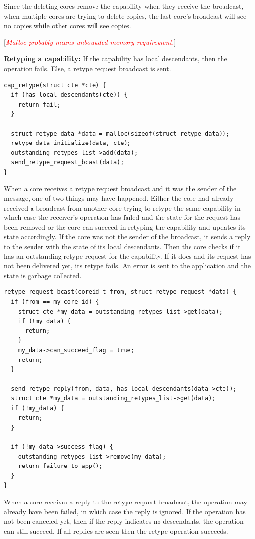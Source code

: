 \documentclass[a4paper,twoside]{report} %
\newcommand{\note}[1]{[\textcolor{red}{\textit{#1}}]}
\begin{document}
Since the deleting cores remove the capability when they receive the
broadcast, when multiple cores are trying to delete copies, the last
core's broadcast will see no copies while other cores will see copies.

\note{Malloc probably means unbounded memory requirement.}

\textbf{Retyping a capability:} If the capability has local
descendants, then the operation fails. Else, a retype request
broadcast is sent.

\begin{verbatim}
cap_retype(struct cte *cte) {
  if (has_local_descendants(cte)) {
    return fail;
  }

  struct retype_data *data = malloc(sizeof(struct retype_data));
  retype_data_initialize(data, cte);
  outstanding_retypes_list->add(data);
  send_retype_request_bcast(data);
}
\end{verbatim}

When a core receives a retype request broadcast and it was the sender
of the message, one of two things may have happened. Either the core
had already received a broadcast from another core trying to retype
the same capability in which case the receiver's operation has failed
and the state for the request has been removed or the core can succeed
in retyping the capability and updates its state accordingly. If the
core was not the sender of the broadcast, it sends a reply to the
sender with the state of its local descendants. Then the core checks
if it has an outstanding retype request for the capability. If it does
and its request has not been delivered yet, its retype fails. An error
is sent to the application and the state is garbage collected.

\begin{verbatim}
retype_request_bcast(coreid_t from, struct retype_request *data) {
  if (from == my_core_id) {
    struct cte *my_data = outstanding_retypes_list->get(data);
    if (!my_data) {
      return;
    }
    my_data->can_succeed_flag = true;
    return;
  }

  send_retype_reply(from, data, has_local_descendants(data->cte));
  struct cte *my_data = outstanding_retypes_list->get(data);
  if (!my_data) {
    return;
  }

  if (!my_data->success_flag) {
    outstanding_retypes_list->remove(my_data);
    return_failure_to_app();
  }
}
\end{verbatim}

When a core receives a reply to the retype request broadcast, the
operation may already have been failed, in which case the reply is
ignored. If the operation has not been canceled yet, then if the reply
indicates no descendants, the operation can still succeed. If all
replies are seen then the retype operation succeeds.
\end{document}
